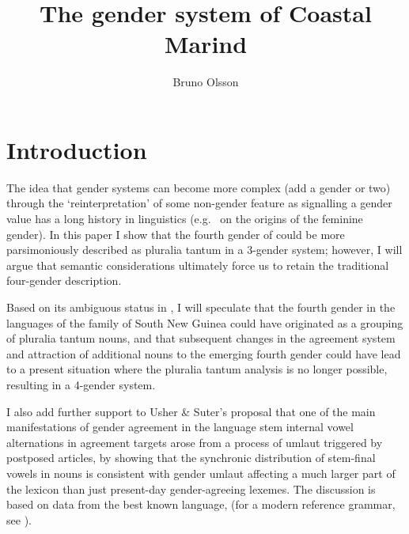 \documentclass[output=collectionpaper]{langsci/langscibook}
\author{Bruno Olsson\affiliation{Australian National University}}
\title{The gender system of Coastal Marind}
\begin{document}
\section{Introduction}
The idea that gender systems can become more complex (add a gender or two) through the `reinterpretation' of some non-gender feature as signalling a gender value has a long history in linguistics (e.g.\ \citealt{Brugmann1891} on the origins of the  feminine gender). In this paper I show that the fourth gender of  could be more parsimoniously described as pluralia tantum in a 3-gender system; however, I will argue that semantic considerations ultimately force us to retain the traditional four-gender description.

Based on its ambiguous status in , I will speculate that the fourth gender in the languages of the  family of South New Guinea could have originated as a grouping of pluralia tantum nouns, and that subsequent changes in the agreement system and attraction of additional nouns to the emerging fourth gender could have lead to a present situation where the pluralia tantum analysis is no longer possible, resulting in a 4-gender system.

I also add further support to Usher \& Suter's \parencite*{Usher2015} proposal that one of the main manifestations of gender agreement in the language \textendash{} stem internal vowel alternations in agreement targets \textendash{} arose from a process of umlaut triggered by postposed articles, by showing that the synchronic distribution of stem-final vowels in nouns is consistent with gender umlaut affecting a much larger part of the lexicon than just present-day gender-agreeing lexemes. The discussion is based on data from the best known  language,  (for a modern reference grammar, see \citealt{Olsson2017}).
\end{document}
